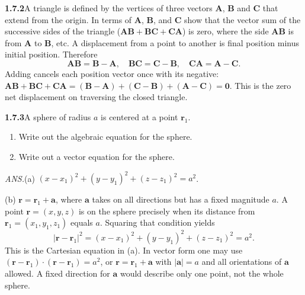 \par\bigskip
\noindent\textbf{1.7.2}\quad A triangle is defined by the vertices of three
vectors $\mathbf{A}$, $\mathbf{B}$ and $\mathbf{C}$ that extend from the
origin. In terms of $\mathbf{A}$, $\mathbf{B}$, and $\mathbf{C}$ show that the
vector sum of the successive sides of the triangle
($\mathbf{AB}+\mathbf{BC}+\mathbf{CA}$) is zero, where the side $\mathbf{AB}$
is from $\mathbf{A}$ to $\mathbf{B}$, etc.
\solution
A displacement from a point to another is final position minus initial
position. Therefore
\[
 \mathbf{AB}=\mathbf B-\mathbf A,\quad
 \mathbf{BC}=\mathbf C-\mathbf B,\quad
 \mathbf{CA}=\mathbf A-\mathbf C.
\]
Adding cancels each position vector once with its negative:
$\mathbf{AB}+\mathbf{BC}+\mathbf{CA}
=(\mathbf B-\mathbf A)+(\mathbf C-\mathbf B)+(\mathbf A-\mathbf C)=\mathbf0$.
This is the zero net displacement on traversing the closed triangle.


\par\bigskip
\noindent\textbf{1.7.3}\quad A sphere of radius $a$ is centered at a point
$\mathbf{r}_{1}$.
\begin{enumerate}
\item[(a)] Write out the algebraic equation for the sphere.
\item[(b)] Write out a vector equation for the sphere.
\end{enumerate}
\par\nobreak\hfill\emph{ANS.}\enspace (a) $(x-x_{1})^{2}+(y-y_{1})^{2}
+(z-z_{1})^{2}=a^{2}$.\par
\hfill(b) $\mathbf{r}=\mathbf{r}_{1}+\mathbf{a}$, where $\mathbf{a}$ takes on
all directions but has a fixed magnitude $a$.
\solution
A point $\mathbf r=(x,y,z)$ is on the sphere precisely when its
distance from $\mathbf r_1=(x_1,y_1,z_1)$ equals $a$. Squaring that
condition yields
\[
 |\mathbf r-\mathbf r_1|^2=(x-x_1)^2+(y-y_1)^2+(z-z_1)^2=a^2.
\]
This is the Cartesian equation in (a). In vector form one may use
$(\mathbf r-\mathbf r_1)\cdot(\mathbf r-\mathbf r_1)=a^2$, or
$\mathbf r=\mathbf r_1+\mathbf a$ with $|\mathbf a|=a$ and all
orientations of $\mathbf a$ allowed. A fixed direction for $\mathbf a$
would describe only one point, not the whole sphere.


